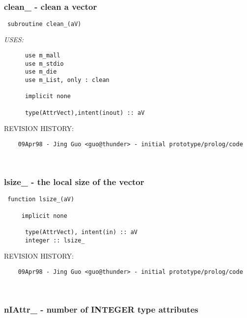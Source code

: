  
\mbox{}\hrulefill\ 
 

 \subsubsection{clean\_ - clean a vector}


 
 
\begin{verbatim} 
 subroutine clean_(aV)\end{verbatim}{\em USES:}
\begin{verbatim}      use m_mall
      use m_stdio
      use m_die
      use m_List, only : clean
 
      implicit none
 
      type(AttrVect),intent(inout) :: aV
 \end{verbatim}{\sf REVISION HISTORY:}
\begin{verbatim}  	09Apr98 - Jing Guo <guo@thunder> - initial prototype/prolog/code\end{verbatim}
 
 
\mbox{}\hrulefill\ 
 

 \subsubsection{lsize\_ - the local size of the vector}


 
 
\begin{verbatim} 
 function lsize_(aV)
 
     implicit none
 
      type(AttrVect), intent(in) :: aV
      integer :: lsize_
 \end{verbatim}{\sf REVISION HISTORY:}
\begin{verbatim}  	09Apr98 - Jing Guo <guo@thunder> - initial prototype/prolog/code\end{verbatim}
 
 
\mbox{}\hrulefill\ 
 

 \subsubsection{nIAttr\_ - number of INTEGER type attributes}


